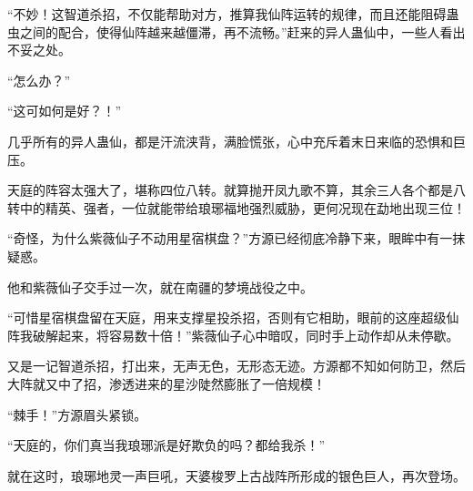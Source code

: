 \begin{this_body}
“不妙！这智道杀招，不仅能帮助对方，推算我仙阵运转的规律，而且还能阻碍蛊虫之间的配合，使得仙阵越来越僵滞，再不流畅。”赶来的异人蛊仙中，一些人看出不妥之处。

“怎么办？”

“这可如何是好？！”

几乎所有的异人蛊仙，都是汗流浃背，满脸慌张，心中充斥着末日来临的恐惧和巨压。

天庭的阵容太强大了，堪称四位八转。就算抛开凤九歌不算，其余三人各个都是八转中的精英、强者，一位就能带给琅琊福地强烈威胁，更何况现在勐地出现三位！

“奇怪，为什么紫薇仙子不动用星宿棋盘？”方源已经彻底冷静下来，眼眸中有一抹疑惑。

他和紫薇仙子交手过一次，就在南疆的梦境战役之中。

“可惜星宿棋盘留在天庭，用来支撑星投杀招，否则有它相助，眼前的这座超级仙阵我破解起来，将容易数十倍！”紫薇仙子心中暗叹，同时手上动作却从未停歇。

又是一记智道杀招，打出来，无声无色，无形态无迹。方源都不知如何防卫，然后大阵就又中了招，渗透进来的星沙陡然膨胀了一倍规模！

“棘手！”方源眉头紧锁。

“天庭的，你们真当我琅琊派是好欺负的吗？都给我杀！”

就在这时，琅琊地灵一声巨吼，天婆梭罗上古战阵所形成的银色巨人，再次登场。

\end{this_body}

